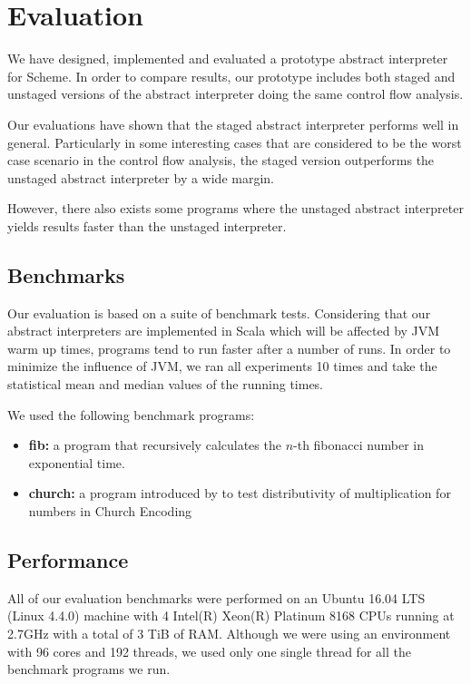 \section{Evaluation} \label{evaluation}

We have designed, implemented and evaluated a prototype abstract interpreter for Scheme.
In order to compare results, our prototype includes both staged and unstaged versions of
the abstract interpreter doing the same control flow analysis.

Our evaluations have shown that the staged abstract interpreter performs well in general.
Particularly in some interesting cases that are considered to be the worst case scenario
in the control flow analysis, the staged version outperforms the unstaged abstract 
interpreter by a wide margin. 

However, there also exists some programs where the unstaged abstract interpreter yields 
results faster than the unstaged interpreter.

\subsection{Benchmarks}

Our evaluation is based on a suite of benchmark tests. Considering that our abstract 
interpreters are implemented in Scala which will be affected by JVM warm up times, programs
tend to run faster after a number of runs. In order to minimize the influence of JVM, 
we ran all experiments 10 times and take the statistical mean and median values of 
the running times.

We used the following benchmark programs:
\begin{itemize}
    \item \textbf{fib:} a program that recursively calculates the $n$-th fibonacci number in
        exponential time.
    \item \textbf{church:} a program introduced by  to test distributivity of multiplication for numbers in Church Encoding 
\end{itemize}

\subsection{Performance}
All of our evaluation benchmarks were performed on an Ubuntu 16.04 LTS (Linux 4.4.0) machine 
with 4 Intel(R) Xeon(R) Platinum 8168 CPUs running at 2.7GHz with a total of 3 TiB of RAM.
Although we were using an environment with 96 cores and 192 threads, we used only
one single thread for all the benchmark programs we run.

